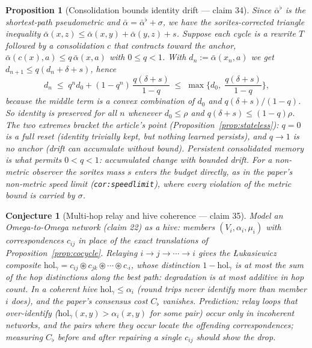\documentclass[11pt,a4paper]{article}
\newtheorem{proposition}[definition]{Proposition}
\newtheorem{conjecture}[definition]{Conjecture}
\begin{document}
\begin{proposition}[Consolidation bounds identity drift --- claim 34]
\label{prop:v2-drift}
Since $\bar\alpha^{\flat}$ is the shortest-path pseudometric and
$\bar\alpha=\bar\alpha^{\flat}+\sigma$, we have the sorites-corrected triangle
inequality $\bar\alpha(x,z)\le\bar\alpha(x,y)+\bar\alpha(y,z)+s$. Suppose each
cycle is a rewrite $T$ followed by a consolidation $c$ that contracts toward
the anchor, $\bar\alpha(c(x),a)\le q\,\bar\alpha(x,a)$ with $0\le q<1$. With
$d_n:=\bar\alpha(x_n,a)$ we get $d_{n+1}\le q(d_n+\delta+s)$, hence
\[
  d_n\;\le\;q^n d_0+(1-q^n)\,\frac{q(\delta+s)}{1-q}
  \;\le\;\max\Big\{d_0,\;\frac{q(\delta+s)}{1-q}\Big\},
\]
because the middle term is a convex combination of $d_0$ and
$q(\delta+s)/(1-q)$. So identity is preserved for all $n$ whenever
$d_0\le\rho$ and $q(\delta+s)\le(1-q)\rho$. The two extremes bracket the
article's point (Proposition~\ref{prop:stateless}): $q=0$ is a full reset
(identity trivially kept, but nothing learned persists), and $q\to1$ is no
anchor (drift can accumulate without bound). Persistent consolidated memory is
what permits $0<q<1$: accumulated change with bounded drift. For a non-metric
observer the sorites mass $s$ enters the budget directly, as in the paper's
non-metric speed limit (\texttt{cor:speedlimit}), where every violation of
the metric bound is carried by $\sigma$.
\end{proposition}

\begin{conjecture}[Multi-hop relay and hive coherence --- claim 35]
\label{conj:v2-cocycle}
Model an Omega-to-Omega network (claim 22) as a hive: members
$(V_i,\alpha_i,\mu_i)$ with correspondences $c_{ij}$ in place of the exact
translations of Proposition~\ref{prop:cocycle}. Relaying $i\to j\to\cdots\to i$
gives the \L{}ukasiewicz composite
$\mathrm{hol}_\gamma=c_{ij}\circledast c_{jk}\circledast\cdots\circledast c_{\cdot i}$,
whose distinction $1-\mathrm{hol}_\gamma$ is at most the sum of the hop
distinctions along the best path: degradation is at most additive in hop
count. In a coherent hive $\mathrm{hol}_\gamma\le\alpha_i$ (round trips never
identify more than member $i$ does), and the paper's consensus cost
$C_\flat$ vanishes. Prediction: relay loops that \emph{over}-identify
($\mathrm{hol}_\gamma(x,y)>\alpha_i(x,y)$ for some pair) occur only in
incoherent networks, and the pairs where they occur locate the offending
correspondences; measuring $C_\flat$ before and after repairing a single
$c_{ij}$ should show the drop.
\end{conjecture}
\end{document}
